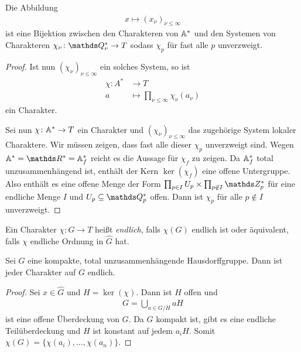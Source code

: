 \begin{prop}
Die Abbildung
\begin{align*}
x \mapsto (x_\nu)_{\nu \leq \infty}
\end{align*}
ist eine Bijektion zwischen den Charakteren von $\mathbb{A}^\ast$ und den Systemen von Charakteren $\chi_\nu \colon \Q_\nu^\ast \to T$ sodass $\chi_p$ für fast alle $p$ unverzweigt.
\end{prop}
\begin{proof}
Ist nun $(\chi_\nu)_{\nu \leq \infty}$ ein solches System, so ist
\begin{align*}
\chi \colon A^\ast &\to T\\
a&\mapsto \prod_{\nu \leq \infty} \chi_\nu(a_\nu)
\end{align*}
ein Charakter.

Sei nun $\chi \colon \mathbb{A}^\ast \to T$ ein Charakter und $(\chi_\nu)_{\nu \leq \infty}$ das zugehörige System lokaler Charaktere.
Wir müssen zeigen, dass fast alle dieser $\chi_p$ unverzweigt sind.
Wegen $\A^\ast=\R^\ast=\A_f^\ast$ reicht es die Aussage für $\chi_f$ zu zeigen.
Da $\mathbb{A}_f^\ast$ total unzusammenhängend ist, enthält der Kern $\ker(\chi_f)$ eine offene Untergruppe.
Also enthält es eine offene Menge der Form
$\prod_{p \in I} U_p \times \prod_{p \not \in I} \Z_p^\ast$ für eine endliche Menge $I$ und $U_p \subseteq \Q_p^\ast$ offen.
Dann ist $\chi_p$ für alle $p \not  \in I$ unverzweigt.
\end{proof}

\begin{defi}
Ein Charakter $\chi \colon G \to T$ heißt \emph{endlich}, falls $\chi(G)$ endlich ist oder äquivalent, falls $\chi$ endliche Ordnung in $\hat{G}$ hat.
\end{defi}

\begin{prop}
Sei $G$ eine kompakte, total unzusammenhängende Hausdorffgruppe.
Dann ist jeder Charakter auf $G$ endlich.
\end{prop}
\begin{proof}
Sei $x \in \hat{G}$ und $H=\ker(\chi)$.
Dann ist $H$ offen und
\begin{align*}
G=\bigcup_{a \in G/H} aH
\end{align*}
ist eine offene Überdeckung von $G$.
Da $G$ kompakt ist, gibt es eine endliche Teilüberdeckung und $H$ ist konstant auf jedem $a_i H$. Somit $\chi(G)=\{\chi(a_i),\dots,\chi(a_n)\}$.
\end{proof}

